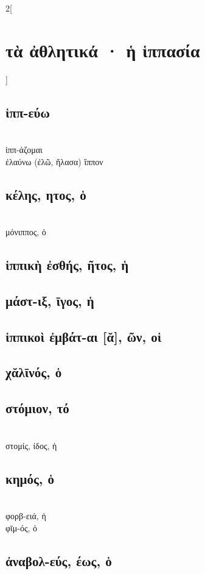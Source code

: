 \documentclass{book}
\begin{document}
\begin{multicols}{2}[\section{τὰ ἀθλητικά · ἡ ἱππασία}]
\subsection{ἱππ-εύω}
 ~\\
ἱππ-άζομαι
 ~\\
ἐλαύνω (ἐλῶ, ἤλασα) ἵππον
\subsection{κέλης, ητος, ὁ}  ~\\
μόνιππος, ὁ
\subsection{ἱππικὴ ἐσθής, ῆτος, ἡ}
\subsection{μάστ-ιξ, ῑγος, ἡ}
\subsection{ἱππικοὶ ἐμβάτ-αι [ᾰ], ῶν, οἱ}
\subsection{χᾰλῑνός, ὁ}
\subsection{στόμιον, τό}  ~\\
στομίς, ίδος, ἡ 
\subsection{κημός, ὁ}  ~\\
φορβ-ειά, ἡ  ~\\
φῑμ-ός, ὁ 
\subsection{ἀναβολ-εύς, έως, ὁ}

\end{multicols}
\end{document}
